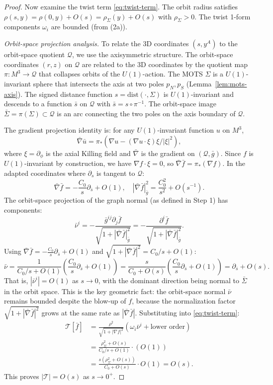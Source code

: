 \documentclass[12pt]{article}
\theoremstyle{plain}
\theoremstyle{definition}
\theoremstyle{remark}
\begin{document}
\begin{proof}
Now examine the twist term \eqref{eq:twist-term}. The orbit radius satisfies $\rho(s, y) = \rho(0, y) + O(s) = \rho_\Sigma(y) + O(s)$ with $\rho_\Sigma > 0$. The twist 1-form components $\omega_i$ are bounded (from (2a)). 

\textit{Orbit-space projection analysis.} To relate the 3D coordinates $(s, y^A)$ to the orbit-space quotient $\mathcal{Q}$, we use the axisymmetric structure. The orbit-space coordinates $(r, z)$ on $\mathcal{Q}$ are related to the 3D coordinates by the quotient map $\pi: M^3 \to \mathcal{Q}$ that collapses orbits of the $U(1)$-action. The MOTS $\Sigma$ is a $U(1)$-invariant sphere that intersects the axis at two poles $p_N, p_S$ (Lemma~\ref{lem:mots-axis}). The signed distance function $s = \mathrm{dist}(\cdot, \Sigma)$ is $U(1)$-invariant and descends to a function $\bar{s}$ on $\mathcal{Q}$ with $\bar{s} = s \circ \pi^{-1}$. The orbit-space image $\bar{\Sigma} = \pi(\Sigma) \subset \mathcal{Q}$ is an arc connecting the two poles on the axis boundary of $\mathcal{Q}$.

The gradient projection identity is: for any $U(1)$-invariant function $u$ on $M^3$,
\[
\bar{\nabla}\bar{u} = \pi_*(\nabla u - (\nabla u \cdot \xi)\xi/|\xi|^2),
\]
where $\xi = \partial_\phi$ is the axial Killing field and $\bar{\nabla}$ is the gradient on $(\mathcal{Q}, \bar{g})$. Since $f$ is $U(1)$-invariant by construction, we have $\nabla f \cdot \xi = 0$, so $\bar{\nabla}\bar{f} = \pi_*(\nabla f)$. In the adapted coordinates where $\partial_s$ is tangent to $\mathcal{Q}$:
\[
\bar{\nabla}\bar{f} = -\frac{C_0}{s}\partial_{\bar{s}} + O(1), \quad |\bar{\nabla}\bar{f}|^2_{\bar{g}} = \frac{C_0^2}{s^2} + O(s^{-1}).
\]
The orbit-space projection of the graph normal (as defined in Step 1) has components:
\[
\bar{\nu}^i = -\frac{\bar{g}^{ij}\partial_j \bar{f}}{\sqrt{1 + |\bar{\nabla}\bar{f}|^2_{\bar{g}}}} = -\frac{\partial^i \bar{f}}{\sqrt{1 + |\bar{\nabla}\bar{f}|^2_{\bar{g}}}}.
\]
Using $\bar{\nabla}\bar{f} = -\frac{C_0}{s}\partial_{\bar{s}} + O(1)$ and $\sqrt{1 + |\bar{\nabla}\bar{f}|^2} = C_0/s + O(1)$:
\[
\bar{\nu} = \frac{1}{C_0/s + O(1)}\left(\frac{C_0}{s}\partial_{\bar{s}} + O(1)\right) = \frac{s}{C_0 + O(s)}\left(\frac{C_0}{s}\partial_{\bar{s}} + O(1)\right) = \partial_{\bar{s}} + O(s).
\]
That is, $|\bar{\nu}^i| = O(1)$ as $s \to 0$, with the dominant direction being normal to $\bar{\Sigma}$ in the orbit space. This is the key geometric fact: the orbit-space normal $\bar{\nu}$ remains bounded despite the blow-up of $f$, because the normalization factor $\sqrt{1 + |\bar{\nabla}\bar{f}|^2}$ grows at the same rate as $|\bar{\nabla}\bar{f}|$.
Substituting into \eqref{eq:twist-term}:
\begin{align}
\mathcal{T}[\bar{f}] &= \frac{\rho^2}{\sqrt{1 + |\nabla f|^2}} \left( \omega_i \bar{\nu}^i + \text{lower order}\right) \\
&= \frac{\rho_\Sigma^2 + O(s)}{C_0/s + O(1)} \cdot (O(1)) \\
&= \frac{s(\rho_\Sigma^2 + O(s))}{C_0 + O(s)} \cdot O(1) = O(s).
\end{align}
This proves $|\mathcal{T}| = O(s)$ as $s \to 0^+$.


\end{proof}
\end{document}
